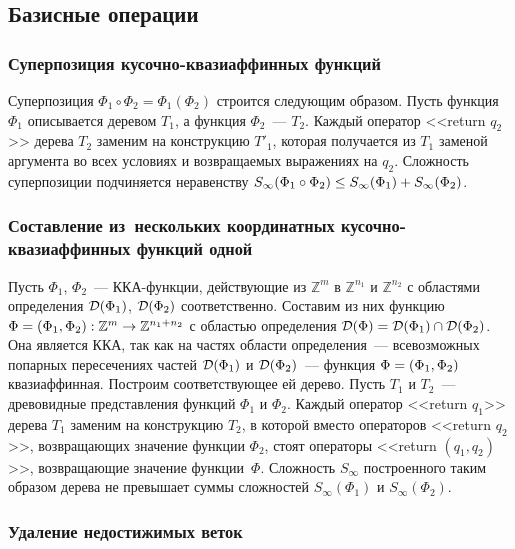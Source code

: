 \begin{multicols}{2}
\subsection{Базисные операции} %


\subsubsection{Суперпозиция кусочно-квазиаффинных функций} %

Суперпозиция $\Phi_1\circ\Phi_2=\Phi_1(\Phi_2)$ строится следующим
образом. Пусть функция $\Phi_1$ описывается деревом $T_1$, а функция
$\Phi_2$~--- $T_2$. Каждый оператор <<return $q_2$>> дерева $T_2$
заменим на конструкцию $T'_1$, которая получается из $T_1$ заменой
аргумента во всех условиях и возвращаемых выражениях на $q_2$.
Сложность суперпозиции подчиняется неравенству
$S_\infty(\Phi_1\circ\Phi_2)\hm\leq S_\infty(\Phi_1) \hm+
S_\infty(\Phi_2)$.

\subsubsection{Составление из~нескольких координатных кусочно-квазиаффинных 
функций одной} %

Пусть $\Phi_1$, $\Phi_2$~--- ККА-функции, действующие из
$\mathbb{Z}^m$ в $\mathbb{Z}^{n_1}$ и $\mathbb{Z}^{n_2}$ с областями
определения ${\cal D}(\Phi_1)$, ${\cal D}(\Phi_2)$ соответственно.
Составим из них функцию $\Phi \hm=(\Phi_1,\Phi_2):\mathbb{Z}^m\to\mathbb{Z}^{n_1+n_2}$ 
с областью
определения ${\cal D}(\Phi)\hm={\cal D}(\Phi_1)\cap{\cal D}(\Phi_2)$.
Она является ККА, так как на частях области
определения~--- всевозможных попарных пересечениях частей ${\cal
D}(\Phi_1)$ и ${\cal D}(\Phi_2)$~--- функция $\Phi\hm=(\Phi_1,\Phi_2)$
квазиаффинная. Построим соответствующее ей дерево. Пусть $T_1$ и
$T_2$~--- древовидные представления функций $\Phi_1$ и $\Phi_2$.
Каждый оператор <<return $q_1$>> дерева $T_1$ заменим на конструкцию
$T_2$, в которой вмес\-то операторов <<return $q_2$>>, возвращающих
значение функции $\Phi_2$, стоят операторы <<return $(q_1,q_2)$>>,
возвращающие значение функции~$\Phi$. Сложность $S_\infty$
построенного таким образом дерева не превышает суммы сложностей
$S_\infty(\Phi_1)$ и $S_\infty(\Phi_2)$.


\subsubsection{Удаление недостижимых веток} %


\end{multicols}
